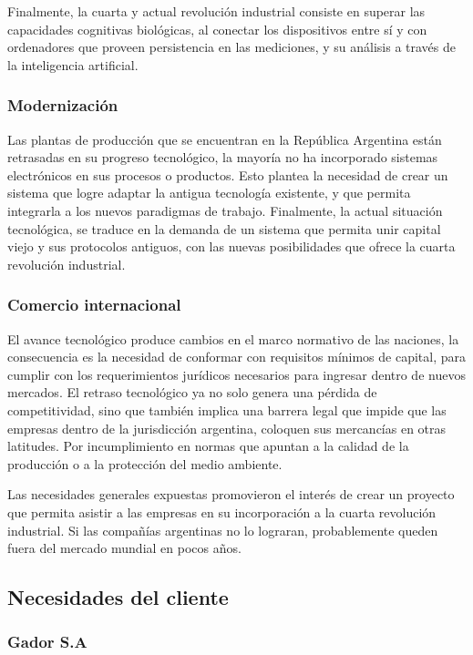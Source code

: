 			Finalmente, la cuarta y actual revolución industrial consiste en superar las capacidades cognitivas biológicas, al conectar los dispositivos entre sí y con ordenadores que proveen persistencia en las mediciones, y su análisis a través de la inteligencia artificial.
	
		\subsubsection{Modernización}

			Las plantas de producción que se encuentran en la República Argentina están retrasadas en su progreso tecnológico, la mayoría no ha incorporado sistemas electrónicos en sus procesos o productos. Esto plantea la necesidad de crear un sistema que logre adaptar la antigua tecnología existente, y que permita integrarla a los nuevos paradigmas de trabajo. Finalmente, la actual situación tecnológica, se traduce en la demanda de un sistema que permita unir capital viejo y sus protocolos antiguos, con las nuevas posibilidades que ofrece la cuarta revolución industrial.

		\subsubsection{Comercio internacional}
			
			El avance tecnológico produce cambios en el marco normativo de las naciones, la consecuencia es la necesidad de conformar con requisitos mínimos de capital, para cumplir con los requerimientos jurídicos necesarios para ingresar dentro de nuevos mercados. El retraso tecnológico ya no solo genera una pérdida de competitividad, sino que también implica una barrera legal que impide que las empresas dentro de la jurisdicción argentina, coloquen sus mercancías en otras latitudes. Por incumplimiento en normas que apuntan a la calidad de la producción o a la protección del medio ambiente.

			Las necesidades generales expuestas promovieron el interés de crear un proyecto que permita asistir a las empresas en su incorporación a la cuarta revolución industrial. Si las compañías argentinas no lo lograran, probablemente queden fuera del mercado mundial en pocos años.

	\subsection{Necesidades del cliente}
	
		\subsubsection{Gador S.A}
		
